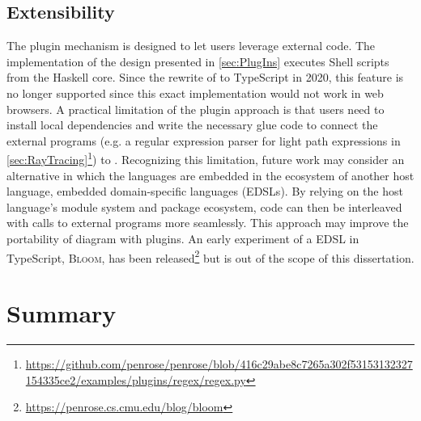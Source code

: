 

\subsection{Extensibility}
\label{sec:penrose-extensibility-limitation}

The plugin mechanism is designed to let \Penrose{} users leverage external code. The implementation of the design presented in \cref{sec:PlugIns} executes Shell scripts from the Haskell core. Since the rewrite of \Penrose{} to TypeScript in 2020, this feature is no longer supported since this exact implementation would not work in web browsers.
A practical limitation of the plugin approach is that \Penrose{} users need to install local dependencies and write the necessary glue code to connect the external programs (e.g. a regular expression parser for light path expressions in \cref{sec:RayTracing}\footnote{\url{https://github.com/penrose/penrose/blob/416c29abe8c7265a302f53153132327154335ce2/examples/plugins/regex/regex.py}}) to \Penrose{}. Recognizing this limitation, future work may consider an alternative in which the \Penrose{} languages are embedded in the ecosystem of another host language, \ie embedded domain-specific languages (EDSLs). By relying on the host language's module system and package ecosystem, \Penrose{} code can then be interleaved with calls to external programs more seamlessly. This approach may improve the portability of \Penrose{} diagram with plugins. An early experiment of a \Penrose{} EDSL in TypeScript, \textsc{Bloom}, has been released\footnote{\url{https://penrose.cs.cmu.edu/blog/bloom}} but is out of the scope of this dissertation.


\section{Summary}
\label{sec:DiscussionandFutureWork}

